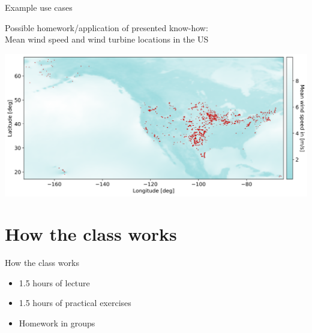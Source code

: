\documentclass[10pt,color=usenames,dvipsnames]{beamer}
\begin{document}
\begin{frame}{Example use cases}

	Possible homework/application of presented know-how:\\

    Mean wind speed and wind turbine locations in the US

    \includegraphics[width=\textwidth]{mean_wind_speed_and_turbines.png}\\

\end{frame}

\section{How the class works}

\begin{frame}{How the class works}
	\begin{itemize}
		\item 1.5 hours of lecture
		\item 1.5 hours of practical exercises
		\item Homework in groups
	\end{itemize}
\end{frame}
\end{document}

